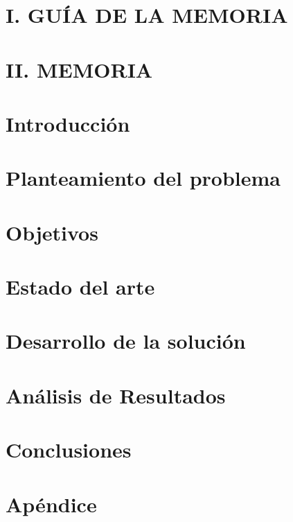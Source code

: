 \documentclass[book,spanish,a4paper,12pt]{tfg}
\begin{document}
\tableofcontents

\pagestyle{tfg}
\justify




\renewcommand{\thechapter}{I} %

\chapter*{\centering I. GUÍA DE LA MEMORIA}


\chapter*{\centering II. MEMORIA}


\renewcommand{\thechapter}{\arabic{chapter}}

\chapter{Introducción}


\chapter{Planteamiento del problema}


\chapter{Objetivos}


\chapter{Estado del arte}


\chapter{Desarrollo de la solución}


\chapter{Análisis de Resultados}


\chapter{Conclusiones}



\pagestyle{appendix}

\appendix
\chapter{Apéndice}




\end{document}

